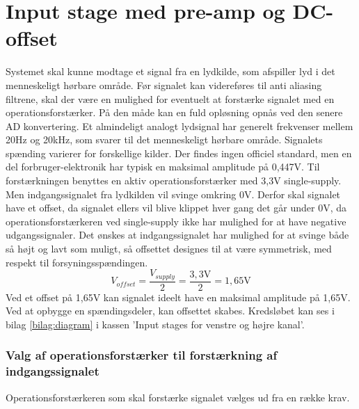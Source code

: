 \section{Input stage med pre-amp og DC-offset}
\label{sec:inputstage}
Systemet skal kunne modtage et signal fra en lydkilde, som afspiller lyd i det menneskeligt hørbare område. 
Før signalet kan videreføres til anti aliasing filtrene, skal der være en mulighed for eventuelt at forstærke signalet med en operationsforstærker. 
På den måde kan en fuld opløsning opnås ved den senere AD konvertering. 
\newline
Et almindeligt analogt lydsignal har generelt frekvenser mellem 20Hz og 20kHz, som svarer til det menneskeligt hørbare område. 
Signalets spænding varierer for forskellige kilder. 
Der findes ingen officiel standard, men en del forbruger-elektronik har typisk en maksimal amplitude på 0,447V.\cite{wikiLine} 
\newline
Til forstærkningen benyttes en aktiv operationsforstærker med 3,3V single-supply. 
Men indgangssignalet fra lydkilden vil svinge omkring 0V. 
Derfor skal signalet have et offset, da signalet ellers vil blive klippet hver gang det går under 0V, da operationsforstærkeren ved single-supply ikke har mulighed for at have negative udgangssignaler. 
Det ønskes at indgangssignalet har mulighed for at svinge både så højt og lavt som muligt, så offsettet designes til at være symmetrisk, med respekt til  forsyningsspændingen. 
\begin{equation}
	{V_{offset}} = \frac{V_{supply}}{2} = \frac{3,3\text{V}}{2} = 1,65\text{V}
\end{equation}
Ved et offset på 1,65V kan signalet ideelt have en maksimal amplitude på 1,65V. 
Ved at opbygge en spændingsdeler, kan offsettet skabes. 
Kredsløbet kan ses i bilag \ref{bilag:diagram} i kassen 'Input stages for venstre og højre kanal'.

\subsubsection{Valg af operationsforstærker til forstærkning af indgangssignalet}
Operationsforstærkeren som skal forstærke signalet vælges ud fra en række krav. 

